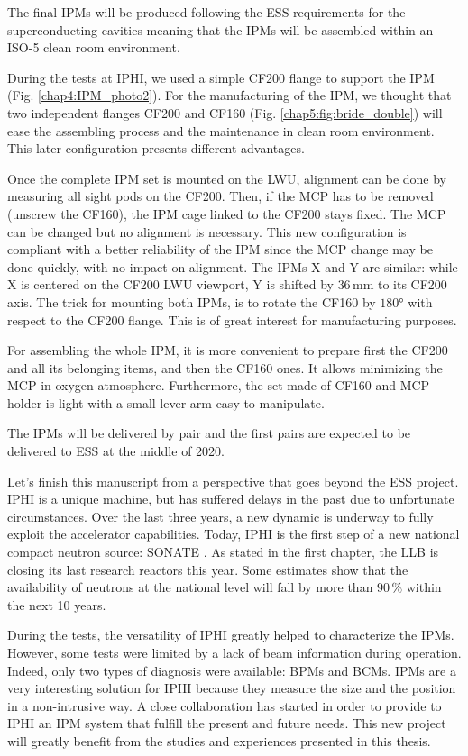 The final IPMs will be produced following the ESS requirements for the superconducting cavities meaning that the IPMs will be assembled within an ISO-5 clean room environment.

During the tests at IPHI, we used a simple CF200 flange to support the IPM (Fig. \ref{chap4:IPM_photo2}). For the manufacturing of the IPM, we thought that two independent flanges CF200 and CF160 (Fig. \ref{chap5:fig:bride_double}) will ease the assembling process and the maintenance in clean room environment. This later configuration presents different advantages.



Once the complete IPM set is mounted on the LWU, alignment can be done by measuring all sight pods on the CF200. Then, if the MCP has to be removed (unscrew the CF160), the IPM cage linked to the CF200 stays fixed. The MCP can be changed but no alignment is necessary. This new configuration is compliant with a better reliability of the IPM since the MCP change may be done quickly, with no impact on alignment. The IPMs X and Y are similar: while X is centered on the CF200 LWU viewport, Y is shifted by $36\,\mathrm{mm}$ to its CF200 axis. The trick for mounting both IPMs, is to rotate the CF160 by $180°$ with respect to the CF200 flange. This is of great interest for manufacturing purposes.

For assembling the whole IPM, it is more convenient to prepare first the CF200 and all its belonging items, and then the CF160 ones. It allows minimizing the MCP in oxygen atmosphere. Furthermore, the set made of CF160 and MCP holder is light with a small lever arm easy to manipulate.

The IPMs will be delivered by pair and the first pairs are expected to be delivered to ESS at the middle of 2020.

Let's finish this manuscript from a perspective that goes beyond the ESS project. IPHI is a unique machine, but has suffered delays in the past due to unfortunate circumstances. Over the last three years, a new dynamic is underway to fully exploit the accelerator capabilities. Today, IPHI is the first step of a new national compact neutron source: SONATE \cite{Marchix_2018}. As stated in the first chapter, the LLB is closing its last research reactors this year. Some estimates show that the availability of neutrons at the national level will fall by more than $90\,\mathrm{\%}$ within the next 10 years.

During the tests, the versatility of IPHI greatly helped to characterize the IPMs. However, some tests were limited by a lack of beam information during operation. Indeed, only two types of diagnosis were available: BPMs and BCMs. IPMs are a very interesting solution for IPHI because they measure the size and  the position in a non-intrusive way. A close collaboration has started in order to provide to IPHI an IPM system that fulfill the present and future needs. This new project will greatly benefit from the studies and experiences presented in this thesis.

